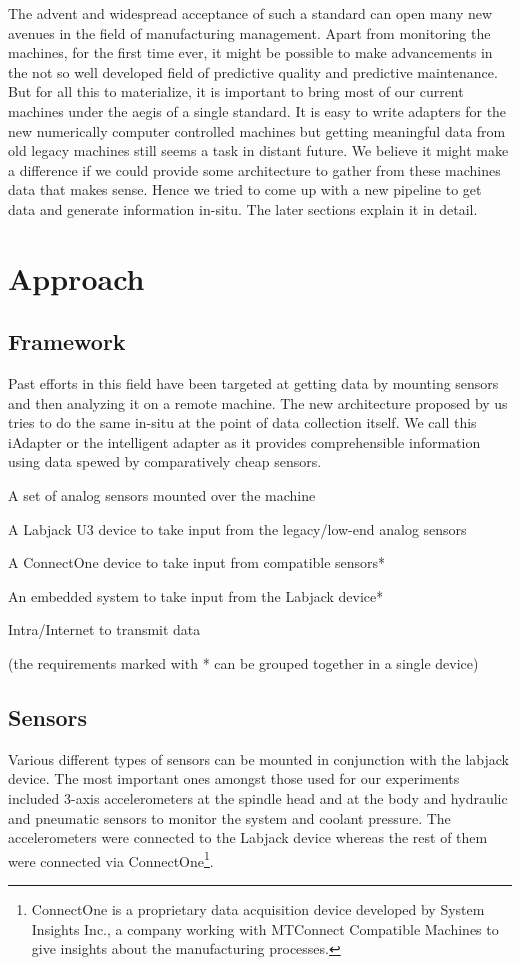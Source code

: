 \documentclass[preprint,authoryear,5p,times,twocolumn]{elsarticle}
\begin{document}
The advent and widespread acceptance of such a standard can open many new avenues in the field of manufacturing management. Apart from monitoring the machines, for the first time ever, it might be possible to make advancements in the not so well developed field of predictive quality and predictive maintenance. But for all this to materialize, it is important to bring most of our current machines under the aegis of a single standard. It is easy to write adapters for the new numerically computer controlled machines but getting meaningful data from old legacy machines still seems a task in distant future. We believe it might make a difference if we could provide some architecture to gather from these machines data that makes sense. Hence we tried to come up with a new pipeline to get data and generate information in-situ. The later sections explain it in detail.

\section{Approach}
\label{Approach}
\subsection{Framework}
Past efforts in this field have been targeted at getting data by mounting sensors and then analyzing it on a remote machine. The new architecture proposed by us tries to do the same in-situ at the point of data collection itself. We call this iAdapter or the intelligent adapter as it provides comprehensible information using data spewed by comparatively cheap sensors.

\begin{list}{-}{The iAdapter hardware framework is conceived as follows:}
\item A set of analog sensors mounted over the machine \item A Labjack U3 device to take input from the legacy/low-end analog sensors \item A ConnectOne device to take  input from compatible sensors* \item An embedded system to take input from the Labjack device* \item Intra/Internet to transmit data 
\end{list}
(the requirements marked with * can be grouped together in a single device)

\subsection{Sensors}
Various different types of sensors can be mounted in conjunction with the labjack device. The most important ones amongst those used for our experiments included 3-axis accelerometers at the spindle head and at the body and  hydraulic and pneumatic sensors to monitor the system and coolant pressure. The accelerometers were connected to the Labjack device whereas the rest of them were connected via ConnectOne\footnote{ConnectOne is a proprietary data acquisition device developed by System Insights Inc., a company working with MTConnect Compatible Machines to give insights about the manufacturing processes.}.
\end{document}
